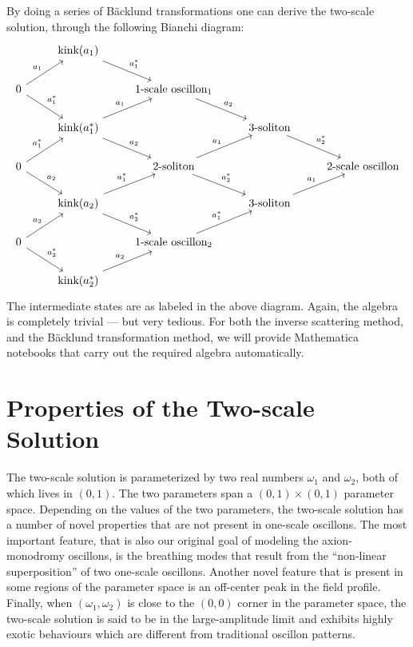 \documentclass{report}
\begin{document}
By doing a series of B\"acklund transformations one can derive the two-scale solution, through the following Bianchi diagram:
\[
\begin{tikzcd}
  & \text{kink}(a_1) \arrow{dr}{a_1^*} &&\\
 0 \arrow{ur}{a_1} \arrow{dr}{a_1^*} & &\text{1-scale oscillon}_1\arrow{dr}{a_2}&\\
  & \text{kink}(a_1^*) \arrow{ur}{a_1} \arrow{dr}{a_2} && \text{3-soliton}\arrow{dr}{a_2^*}&\\
 0 \arrow{ur}{a_1^*} \arrow{dr}{a_2} &&\text{2-soliton}\arrow{ur}{a_1}\arrow{dr}{a_2^*}&&\text{2-scale oscillon}\\
 &\text{kink}(a_2)\arrow{ur}{a_1^*}\arrow{dr}{a_2^*}&&\text{3-soliton}\arrow{ur}{a_1}\\
 0\arrow{ur}{a_2}\arrow{dr}{a_2^*}&&\text{1-scale oscillon}_2\arrow{ur}{a_1^*}\\
 &\text{kink}(a_2^*)\arrow{ur}{a_2}&&
\end{tikzcd}
\]
The intermediate states are as labeled in the above diagram. Again, the algebra is completely trivial --- but very tedious.
\medbreak
For both the inverse scattering method, and the B\"acklund transformation method, we will provide Mathematica notebooks that carry out the required algebra automatically.

\chapter{Properties of the Two-scale Solution}
The two-scale solution is parameterized by two real numbers $\omega_1$ and $\omega_2$, both of which lives in $(0,1)$. The two parameters span a $(0,1)\times(0,1)$ parameter space. Depending on the values of the two parameters, the two-scale solution has a number of novel properties that are not present in one-scale oscillons. The most important feature, that is also our original goal of modeling the axion-monodromy oscillons, is the breathing modes that result from the ``non-linear superposition'' of two one-scale oscillons. Another novel feature that is present in some regions of the parameter space is an off-center peak in the field profile. Finally, when $(\omega_1,\omega_2)$ is close to the $(0,0)$ corner in the parameter space, the two-scale solution is said to be in the large-amplitude limit and exhibits highly exotic behaviours which are different from traditional oscillon patterns.
\end{document}
